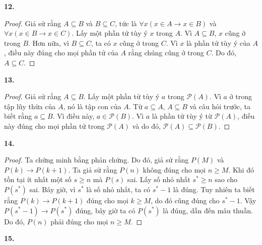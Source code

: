 \documentclass[12pt,a4paper]{article}
\theoremstyle{definition}
\begin{document}
\bigskip
\textbf{12.}

\begin{proof}
Giả sử rằng $A \subseteq B$ và $B \subseteq C$, tức là $\forall x(x \in A \to x \in B)$ và $\forall x(x \in B \to x \in C)$. Lấy một phần tử tùy ý $x$ trong $A$. Vì $A \subseteq B$, $x$ cũng ở trong $B$. Hơn nữa, vì $B \subseteq C$, ta có $x$ cũng ở trong $C$. Vì $x$ là phần tử tùy ý của $A$, điều này đúng cho mọi phần tử của $A$ rằng chúng cũng ở trong $C$. Do đó, $A \subseteq C$.
\end{proof}

\bigskip
\textbf{13.}

\begin{proof}
Giả sử rằng $A \subseteq B$. Lấy một phần tử tùy ý $a$ trong $\mathcal{P}(A)$. Vì $a$ ở trong tập lũy thừa của $A$, nó là tập con của $A$. Từ $a \subseteq A$, $A \subseteq B$ và câu hỏi trước, ta biết rằng $a \subseteq B$. Vì điều này, $a \in \mathcal{P}(B)$. Vì $a$ là phần tử tùy ý từ $\mathcal{P}(A)$, điều này đúng cho mọi phần tử trong $\mathcal{P}(A)$ và do đó, $\mathcal{P}(A) \subseteq \mathcal{P}(B)$.
\end{proof}

\bigskip
\textbf{14.}

\begin{proof}
Ta chứng minh bằng phản chứng. Do đó, giả sử rằng $P(M)$ và $P(k) \to P(k+1)$. Ta giả sử rằng $P(n)$ không đúng cho mọi $n \ge M$. Khi đó tồn tại ít nhất một số $s \ge n$ mà $P(s)$ sai. Lấy số nhỏ nhất $s^* \ge n$ sao cho $P(s^*)$ sai. Bây giờ, vì $s^*$ là số nhỏ nhất, ta có $s^* - 1$ là đúng. Tuy nhiên ta biết rằng $P(k) \to P(k+1)$ đúng cho mọi $k \ge M$, do đó cũng đúng cho $s^* - 1$. Vậy $P(s^* - 1) \to P(s^*)$ đúng, bây giờ ta có $P(s^*)$ là đúng, dẫn đến mâu thuẫn. Do đó, $P(n)$ phải đúng cho mọi $n \ge M$.
\end{proof}

\bigskip
\textbf{15.}
\end{document}
